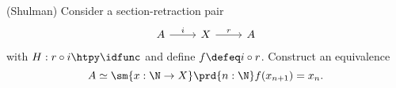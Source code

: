 \begin{exercises}
\begin{equation*}
  \end{equation*}
  \exitem \label{ex:retracts-as-limits}(Shulman) Consider a section-retraction pair
  \begin{equation*}
    \begin{tikzcd}
      A \arrow[r,"i"] & X \arrow[r,"r"] & A
    \end{tikzcd}
  \end{equation*}
  with $H:r\circ i\htpy \idfunc$ and define $f\defeq i\circ r$. Construct an equivalence
  \begin{equation*}
    A\simeq\sm{x:\N\to X}\prd{n:\N}f(x_{n+1})=x_n.
  \end{equation*}
\end{exercises}

